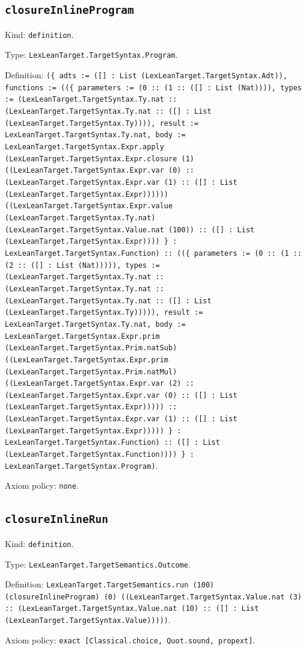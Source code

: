 \documentclass[11pt]{article}
\begin{document}
\subsection*{\texttt{closureInlineProgram}}
\noindent Kind: \texttt{definition}.\par
\noindent Type: \texttt{LexLeanTarget.TargetSyntax.Program}.\par
\noindent Definition: \texttt{(\{ adts := ([] : List (LexLeanTarget.TargetSyntax.Adt)), functions := ((\{ parameters := (0 :: (1 :: ([] : List (Nat)))), types := (LexLeanTarget.TargetSyntax.Ty.nat :: (LexLeanTarget.TargetSyntax.Ty.nat :: ([] : List (LexLeanTarget.TargetSyntax.Ty)))), result := LexLeanTarget.TargetSyntax.Ty.nat, body := LexLeanTarget.TargetSyntax.Expr.apply (LexLeanTarget.TargetSyntax.Expr.closure (1) ((LexLeanTarget.TargetSyntax.Expr.var (0) :: (LexLeanTarget.TargetSyntax.Expr.var (1) :: ([] : List (LexLeanTarget.TargetSyntax.Expr)))))) ((LexLeanTarget.TargetSyntax.Expr.value (LexLeanTarget.TargetSyntax.Ty.nat) (LexLeanTarget.TargetSyntax.Value.nat (100)) :: ([] : List (LexLeanTarget.TargetSyntax.Expr)))) \} : LexLeanTarget.TargetSyntax.Function) :: ((\{ parameters := (0 :: (1 :: (2 :: ([] : List (Nat))))), types := (LexLeanTarget.TargetSyntax.Ty.nat :: (LexLeanTarget.TargetSyntax.Ty.nat :: (LexLeanTarget.TargetSyntax.Ty.nat :: ([] : List (LexLeanTarget.TargetSyntax.Ty))))), result := LexLeanTarget.TargetSyntax.Ty.nat, body := LexLeanTarget.TargetSyntax.Expr.prim (LexLeanTarget.TargetSyntax.Prim.natSub) ((LexLeanTarget.TargetSyntax.Expr.prim (LexLeanTarget.TargetSyntax.Prim.natMul) ((LexLeanTarget.TargetSyntax.Expr.var (2) :: (LexLeanTarget.TargetSyntax.Expr.var (0) :: ([] : List (LexLeanTarget.TargetSyntax.Expr))))) :: (LexLeanTarget.TargetSyntax.Expr.var (1) :: ([] : List (LexLeanTarget.TargetSyntax.Expr))))) \} : LexLeanTarget.TargetSyntax.Function) :: ([] : List (LexLeanTarget.TargetSyntax.Function)))) \} : LexLeanTarget.TargetSyntax.Program)}.\par
\noindent Axiom policy: \texttt{none}.\par
\subsection*{\texttt{closureInlineRun}}
\noindent Kind: \texttt{definition}.\par
\noindent Type: \texttt{LexLeanTarget.TargetSemantics.Outcome}.\par
\noindent Definition: \texttt{LexLeanTarget.TargetSemantics.run (100) (closureInlineProgram) (0) ((LexLeanTarget.TargetSyntax.Value.nat (3) :: (LexLeanTarget.TargetSyntax.Value.nat (10) :: ([] : List (LexLeanTarget.TargetSyntax.Value)))))}.\par
\noindent Axiom policy: \texttt{exact [Classical.choice, Quot.sound, propext]}.\par
\end{document}
